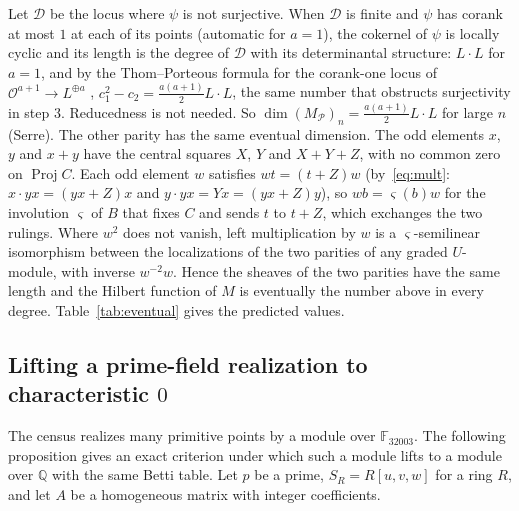 \documentclass[11pt]{article}
\theoremstyle{definition}
\theoremstyle{remark}
\newcommand{\Q}{\mathbb{Q}}
\newcommand{\F}{\mathbb{F}}
\newcommand{\Proj}{\operatorname{Proj}}
\begin{document}
Let $\mathcal D$ be the locus where $\psi$ is not surjective. When $\mathcal D$ is finite and $\psi$ has corank at most $1$ at each of its points (automatic for $a=1$), the cokernel of $\psi$ is locally cyclic and its length is the degree of $\mathcal D$ with its determinantal structure: $L\cdot L$ for $a=1$, and by the Thom--Porteous formula for the corank-one locus of $\mathcal O^{a+1}\to L^{\oplus a}$ \cite{Fulton}, $c_1^2-c_2=\tfrac{a(a+1)}2L\cdot L$, the same number that obstructs surjectivity in step 3. Reducedness is not needed. So $\dim(M_{\mathcal P})_n=\frac{a(a+1)}2L\cdot L$ for large $n$ (Serre). The other parity has the same eventual dimension. The odd elements $x$, $y$ and $x+y$ have the central squares $X$, $Y$ and $X+Y+Z$, with no common zero on $\Proj C$. Each odd element $w$ satisfies $wt=(t+Z)w$ (by~\eqref{eq:mult}: $x\cdot yx=(yx+Z)x$ and $y\cdot yx=Yx=(yx+Z)y$), so $wb=\varsigma(b)w$ for the involution $\varsigma$ of $B$ that fixes $C$ and sends $t$ to $t+Z$, which exchanges the two rulings. Where $w^2$ does not vanish, left multiplication by $w$ is a $\varsigma$-semilinear isomorphism between the localizations of the two parities of any graded $U$-module, with inverse $w^{-2}w$. Hence the sheaves of the two parities have the same length and the Hilbert function of $M$ is eventually the number above in every degree. Table~\ref{tab:eventual} gives the predicted values.

\begin{table}[htbp]
\centering\footnotesize

\caption{Predicted eventual value of the Hilbert function in characteristic $2$ of a general presentation with $a$ generators and $a+1$ relations of degree $e=2m$ or $2m+1$: $\tfrac{a(a+1)}2L\cdot L$ with $L\cdot L=2m^2$ for even $e$ and $2m(m+1)$ for odd $e$; the values for two quadrics, two cubics and the $2\times3$ matrix of quadrics were derived before the experiment and are compared with it in Section~\ref{sec:results}.}
\label{tab:eventual}
\end{table}

\subsection{Lifting a prime-field realization to characteristic \texorpdfstring{$0$}{0}}
\label{sec:lift}

The census realizes many primitive points by a module over $\F_{32003}$. The following proposition gives an exact criterion under which such a module lifts to a module over $\Q$ with the same Betti table. Let $p$ be a prime, $S_R=R[u,v,w]$ for a ring $R$, and let $A$ be a homogeneous matrix with integer coefficients.
\end{document}
